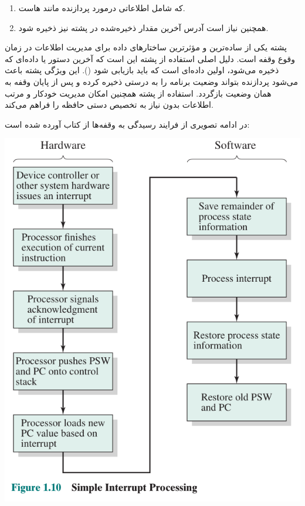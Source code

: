 \begin{enumerate}
\begin{qsolve}
\begin{enumerate}
			\item
			که شامل اطلاعاتی درمورد پردازنده مانند  هاست.
			
			\item
			همچنین نیاز است آدرس آخرین مقدار ذخیره‌شده در پشته نیز ذخیره شود.
			
		\end{enumerate}
	
	\end{qsolve}
	
	
	\begin{qsolve}
		پشته یکی از ساده‌ترین و مؤثرترین ساختارهای داده برای مدیریت اطلاعات در زمان وقوع وقفه است. دلیل اصلی استفاده از پشته این است که آخرین دستور یا داده‌ای که ذخیره می‌شود، اولین داده‌ای است که باید بازیابی شود (). این ویژگی پشته باعث می‌شود پردازنده بتواند وضعیت برنامه را به درستی ذخیره کرده و پس از پایان وقفه به همان وضعیت بازگردد. استفاده از پشته همچنین امکان مدیریت خودکار و مرتب اطلاعات بدون نیاز به تخصیص دستی حافظه را فراهم می‌کند.
		
		در ادامه تصویری از فرایند رسیدگی به وقفه‌ها از کتاب  آورده شده است:
		
		\begin{center}
			\includegraphics*[width=0.8\linewidth]{pics/img1.png}
		\end{center}
		

\end{qsolve}
\end{enumerate}
